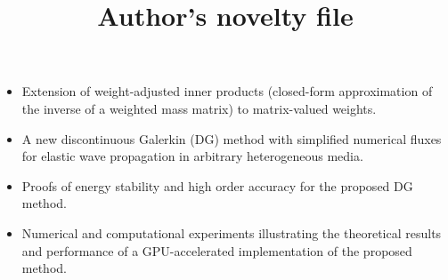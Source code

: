\documentclass[10pt]{article}
\title{Author's novelty file}
\date{}
\author{}
\begin{document}
\maketitle
\begin{itemize}
\item Extension of weight-adjusted inner products (closed-form approximation of the inverse of a weighted mass matrix) to matrix-valued weights.  
\item A new discontinuous Galerkin (DG) method with simplified numerical fluxes for elastic wave propagation in arbitrary heterogeneous media.  
\item Proofs of energy stability and high order accuracy for the proposed DG method.  
\item Numerical and computational experiments illustrating the theoretical results and performance of a GPU-accelerated implementation of the proposed method.  
\end{itemize}
\end{document}
